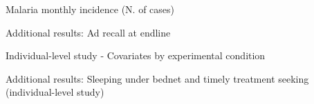 \begin{table}[h!]
    \centering
    \caption{Malaria monthly incidence (N. of cases)}
    \label{tab:incidence_count}
    \footnotesize
    
\end{table}


    \begin{table}[h!]
    \centering
    \caption{Additional results: Ad recall at endline} 
    \footnotesize
    
    \label{tab:mnmadrecall_ols_heterogeneous}
\end{table}


\begin{table}[h!]
    \centering
    \caption{Individual-level study - Covariates by experimental condition} 
     \footnotesize
    
    \label{tab:ind_study_balance}
\end{table}



\begin{table}[h!]
    \centering
   \caption{Additional results: Sleeping under bednet and timely treatment seeking (individual-level study)}
    \footnotesize
    
    \label{tab:bednets_careseeking_individual_extra}
\end{table}







